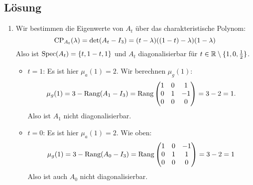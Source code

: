 \subsection{Lösung}
\begin{enumerate}
	\item Wir bestimmen die Eigenwerte von \( A_t \) über das charakteristische Polynom:
	\begin{equation*}
		\text{CP}_{A_t}(\lambda) = \det(A_t - I_3) = (t-\lambda)((1-t)-\lambda)(1-\lambda) 
	\end{equation*}
	Also ist \( \text{Spec}(A_t) = \{ t, 1-t, 1 \} \) und \( A_t \) diagonalisierbar für \( t \in \mathbb{R} \setminus \{ 1, 0, \tfrac{1}{2} \} \).
	\begin{itemize}
		\item \( t = 1 \): Es ist hier \( \mu_a(1) = 2 \). Wir berechnen \( \mu_g(1) \):
		\begin{equation*}
		 	\mu_g(1) = 3 - \text{Rang}(A_1 - I_3) = \text{Rang} \begin{pmatrix}
		 		1 & 0 & 1 \\
		 		0 & 1 & -1 \\
		 		0 & 0 & 0
		 	\end{pmatrix} = 3-2 = 1\text{.}
		 \end{equation*} 
		 Also ist \( A_1 \) nicht diagonalisierbar.

		 \item \( t = 0 \): Es ist hier \( \mu_a(1) = 2 \). Wie oben:
		 \begin{equation*}
		 	\mu_g(1) = 3 - \text{Rang}(A_0 - I_3) = \text{Rang} \begin{pmatrix}
		 		1 & 0 & -1 \\
		 		0 & 1 & 1 \\
		 		0 & 0 & 0
		 	\end{pmatrix} = 3-2 = 1
		 \end{equation*}
		 Also ist auch \( A_0 \) nicht diagonalisierbar.


\end{itemize}
\end{enumerate}
